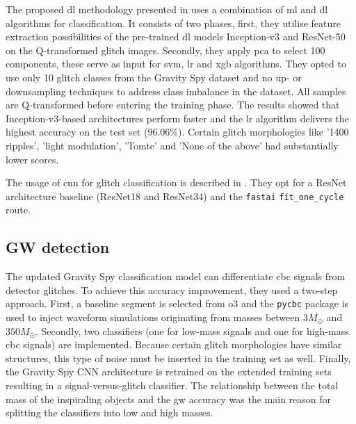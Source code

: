 The proposed \acrshort{dl} methodology presented in \citep{bicskin2023fast} uses a combination of \acrshort{ml} and \acrshort{dl} algorithms for classification. It consists of two phases, first, they utilise feature extraction possibilities of the pre-trained \acrshort{dl} models Inception-v3 \citep{szegedy2016rethinking} and ResNet-50 \citep{he2016deep} on the Q-transformed glitch images. Secondly, they apply \acrshort{pca} to select 100 components, these serve as input for \acrfull{svm}, \acrfull{lr} and \acrshort{xgb} algorithms. They opted to use only 10 glitch classes from the Gravity Spy dataset and no up- or downsampling techniques to address class imbalance in the dataset. All samples are Q-transformed before entering the training phase. The results showed that Inception-v3-based architectures perform faster and the \acrshort{lr} algorithm delivers the highest accuracy on the test set ($96.06$\%). Certain glitch morphologies like '1400 ripples', 'light modulation', 'Tomte' and 'None of the above' had substantially lower scores.

The usage of \acrshort{cnn} for glitch classification is described in \citep{fernandes2023convolutional}. They opt for a ResNet \citep{he2016deep} architecture baseline (ResNet18 and ResNet34) and the \verb|fastai| \verb|fit_one_cycle| route. 

\subsection{GW detection}
The updated Gravity Spy classification model \citep{jarov2023new} can differentiate \acrshort{cbc} signals from detector glitches. To achieve this accuracy improvement, they used a two-step approach. First, a baseline segment is selected from \acrshort{o3} and the \verb|pycbc| package \citep{nitz2020gwastro} is used to inject waveform simulations originating from masses between $3M_{\odot}$ and $350M_{\odot}$. Secondly, two classifiers (one for low-mass signals and one for high-mass \acrshort{cbc} signals) are implemented. Because certain glitch morphologies have similar structures, this type of noise must be inserted in the training set as well. Finally, the Gravity Spy CNN architecture is retrained on the extended training sets resulting in a signal-versus-glitch classifier. The relationship between the total mass of the inspiraling objects and the \acrshort{gw} accuracy was the main reason for splitting the classifiers into low and high masses. 
